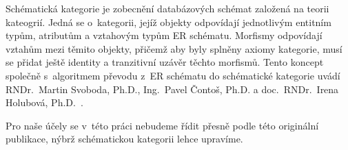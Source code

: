 Schématická kategorie je zobecnění databázových schémat založená na teorii kateogrií.
Jedná se o~kategorii, jejíž objekty odpovídají jednotlivým entitním typům, atributům a vztahovým typům ER schématu.
Morfismy odpovídají vztahům mezi těmito objekty, přičemž aby byly splněny axiomy kategorie, musí se přidat ještě identity a tranzitivní uzávěr těchto morfismů.
Tento koncept společně s~algoritmem převodu z~ER schématu do schématické kategorie uvádí
RNDr.~Martin Svoboda, Ph.D.,
Ing.~Pavel Čontoš, Ph.D.
a
doc.~RNDr.~Irena Holubová, Ph.D.~\cite{svoboda_categorical_2021}.

Pro naše účely se v~této práci nebudeme řídit přesně podle této originální publikace, nýbrž schématickou kategorii lehce upravíme.
